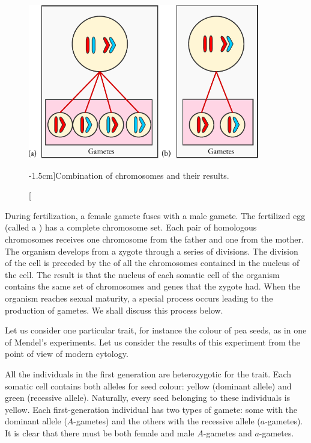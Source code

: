 \begin{figure}[!ht]
\centering
\includegraphics[width=0.9\textwidth]{figures/genes0.pdf}
\caption[][-1.5cm]{Combination of chromosomes and their results.\label{genes0}}
\end{figure}

During fertilization, a female gamete fuses with a male gamete. The
fertilized egg (called a ) has a complete chromosome set. Each pair of homologous chromosomes receives one chromosome from the father and one from the mother. The organism develops from a zygote through a series of divisions. The division of the cell is preceded by the  of all the chromosomes contained in the nucleus of the cell. The result is that the nucleus of each somatic cell of the organism contains the same set of chromosomes and genes that the zygote had. When the organism reaches sexual maturity, a special process occurs leading to the production of gametes. We shall discuss this process
below.

 Let us consider one particular trait, for
instance the colour of pea seeds, as in one of Mendel's experiments. Let
us consider the results of this experiment from the point of view of
modern cytology.

All the individuals in the first generation are heterozygotic for the
trait. Each somatic cell contains both alleles for seed colour: yellow
(dominant allele) and green (recessive allele). Naturally, every seed
belonging to these individuals is yellow. Each first-generation individual
has two types of gamete: some with the dominant allele ($A$-gametes) and
the others with the recessive allele ($a$-gametes). It is clear that there must
be both female and male $A$-gametes and $a$-gametes.

